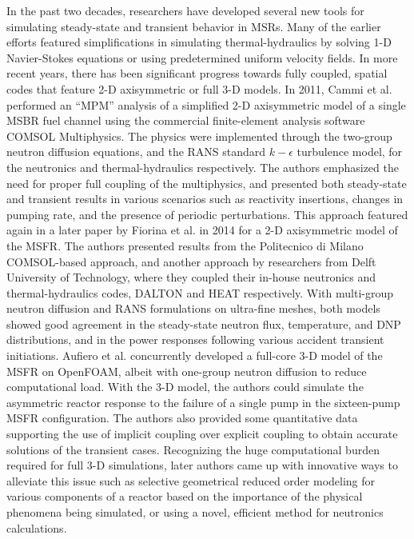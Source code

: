 In the past two decades, researchers have developed several
new tools for simulating steady-state and transient behavior in \glspl{MSR}.
Many of the earlier efforts featured simplifications in simulating
thermal-hydraulics by solving 1-D Navier-Stokes equations or using
predetermined uniform velocity fields. In more recent years, there has been
significant progress towards fully coupled, spatial codes that feature
2-D axisymmetric or full 3-D models. In 2011, Cammi et al. performed an
``\gls{MPM}'' analysis
of a simplified 2-D axisymmetric model of a single MSBR fuel channel using
the commercial finite-element analysis software COMSOL Multiphysics. The
physics were implemented through the two-group neutron diffusion
equations, and the \gls{RANS} standard $k-\epsilon$ turbulence model, for the
neutronics and thermal-hydraulics respectively. The
authors emphasized the need for proper full coupling of the multiphysics, and
presented both steady-state and transient results in various
scenarios such as reactivity insertions, changes in pumping rate, and the
presence of periodic perturbations. This approach featured again in a later
paper by Fiorina et al. in 2014 for a 2-D axisymmetric model of the
\gls{MSFR}. The authors presented results from the Politecnico di Milano
COMSOL-based approach, and another approach by researchers from Delft
University of Technology, where they coupled their in-house neutronics and
thermal-hydraulics codes, DALTON and HEAT respectively. With multi-group
neutron diffusion and \gls{RANS} formulations on ultra-fine meshes, both
models showed good agreement in the steady-state neutron flux, temperature,
and \gls{DNP} distributions, and in the power responses following various
accident transient initiations. Aufiero et al. concurrently developed
a full-core 3-D model of the \gls{MSFR} on OpenFOAM, albeit with one-group
neutron diffusion to reduce computational load. With the 3-D model, the
authors could simulate the asymmetric reactor response to the failure of a
single pump in the sixteen-pump \gls{MSFR} configuration. The authors also
provided some quantitative data supporting the use of implicit coupling over
explicit coupling to obtain accurate solutions of the transient cases.
Recognizing the huge computational burden required for full 3-D simulations, 
later authors came up with innovative ways to alleviate this issue such as
selective geometrical reduced order modeling for various components of a
reactor based on the importance of the physical phenomena being simulated, or 
using a novel, efficient method for neutronics calculations.

